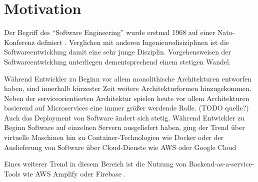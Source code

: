 \section{Motivation}

Der Begriff des "`Software Engineering"' wurde erstmal 1968 auf einer Nato-Konferenz definiert \autocite{naur1969software}. Verglichen mit anderen Ingenieursdisiziplinen ist die Softwareentwicklung damit eine sehr junge Disziplin. Vorgehensweisen der Softwareentwicklung unterliegen dementsprechend einem stetigen Wandel.

Während Entwickler zu Beginn vor allem monolithische Architekturen entworfen haben, sind innerhalb kürzester Zeit weitere Architekturformen hinzugekommen. Neben der serviceorientierten Architektur spielen heute vor allem Architekturen basierend auf Microservices eine immer größer werdende Rolle. (TODO quelle?) Auch das Deployment von Software ändert sich stetig. Während Entwickler zu Beginn Software auf einzelnen Servern ausgeliefert haben, ging der Trend über virtuelle Maschinen hin zu Container-Technologien wie Docker oder der Auslieferung von Software über Cloud-Dienste wie \ac{AWS} oder Google Cloud

Eines weiterer Trend in diesem Bereich ist die Nutzung von Backend-as-a-service-Tools wie \ac{AWS} Amplify oder Firebase \autocite{villamizar2017cost}.